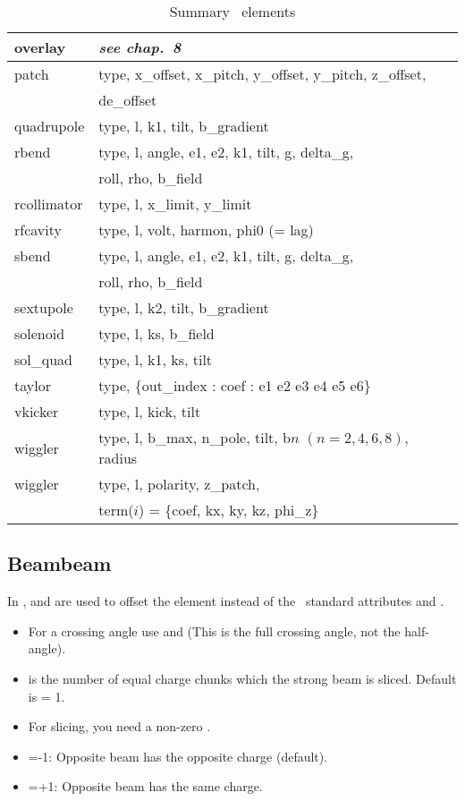\begin{table}
{\begin{tabular}{|l|l|}
    overlay       &  {\sl see chap.~8} \\ \hline
    patch         &  type, x\_offset, x\_pitch, y\_offset, y\_pitch, z\_offset, \\
                  &  de\_offset \\ \hline
    quadrupole    &  type, l, k1, tilt, b\_gradient \\ \hline
    rbend         &  type, l, angle, e1, e2, k1, tilt, g, delta\_g, \\
                  &  roll, rho, b\_field \\ \hline
    rcollimator   &  type, l, x\_limit, y\_limit \\ \hline
    rfcavity      &  type, l, volt, harmon, phi0 (= lag)  \\ \hline
    sbend         &  type, l, angle, e1, e2, k1, tilt, g, delta\_g, \\
                  &  roll, rho, b\_field \\ \hline
    sextupole     &  type, l, k2, tilt, b\_gradient \\ \hline
    solenoid      &  type, l, ks, b\_field \\ \hline 
    sol\_quad     &  type, l, k1, ks, tilt \\ \hline
    taylor        &  type, \{out\_index : coef : e1 e2 e3 e4 e5 e6\} \\ \hline
    vkicker       &  type, l, kick, tilt \\ \hline
    wiggler       &  type, l, b\_max, n\_pole, tilt, b$n$ $(n=2,4,6,8)$, radius \\ \hline
    wiggler       &  type, l, polarity, z\_patch, \\
                  &  term($i$) = \{coef, kx, ky, kz, phi\_z\} \\ \hline
\end{tabular}}
\caption{Summary \bmad\ elements}
\end{table}

\subsection{Beambeam}
In \bmad,  and  are used to offset the
 element instead of the \mad\ standard attributes
 and .
\begin{itemize}
\item For a crossing angle use  and  (This is the full crossing angle,
not the half-angle).
\item {} is the number of equal charge chunks which the strong beam is sliced.
      Default is  = 1.
\item For slicing, you need a non-zero .
\item {}=-1: Opposite beam has the opposite charge (default).
\item {}=+1: Opposite beam has the same charge.   
\end{itemize}

